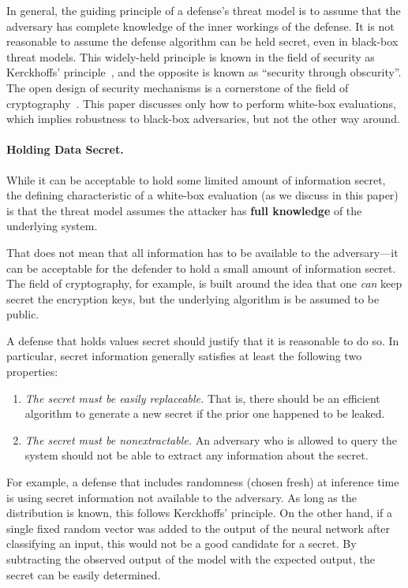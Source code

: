 \documentclass{article} %
\begin{document}
In general, the guiding principle of a defense's threat model
is to assume that the adversary has complete 
knowledge of the inner workings of the
defense.
%
It is not reasonable to assume the defense
algorithm can be held secret, even in black-box threat models.
%
This widely-held principle is known in the field of security as Kerckhoffs'
principle~\citep{kerckhoffs1883cryptographic}, and the opposite is known as
``security through obscurity''.
%
The open design of security mechanisms is
a cornerstone of the field of cryptography~\citep{saltzer1975protection}.
%
This paper discusses only how to perform white-box evaluations, which implies
robustness to black-box adversaries,
but not the other way around. 

\paragraph{Holding Data Secret.}
%
While it can be acceptable to hold some limited amount of information
secret, the defining characteristic of a white-box evaluation (as
we discuss in this paper) is that the threat model assumes
the attacker has \textbf{full knowledge} of the underlying system.

That does not mean that all information has to be available to the
adversary---it can be acceptable for the defender to hold a small
amount of information secret.
%
The field of cryptography, for example, is built around the idea that
one \emph{can} keep secret
the encryption keys, but the underlying algorithm is be assumed to be public.

A defense that holds values secret should justify that it is reasonable to do so.
%
In particular, secret information generally
satisfies at least the following two properties:
\begin{enumerate}
\item \emph{The secret must be easily replaceable.} 
  That is, there should be an efficient algorithm to generate a new secret
  if the prior one happened to be leaked.
\item \emph{The secret must be nonextractable.} An adversary who is
  allowed to query the system should not be able to extract any information
  about the secret.
\end{enumerate}

For example, a defense that includes randomness (chosen fresh) at inference
time is using secret information not available to the adversary.
%
As long as the distribution is known, this follows Kerckhoffs' principle.
%
On the other hand, if a single fixed random vector was added to the output
of the neural network after classifying an input, this would not be a good
candidate for a secret.
%
By subtracting the observed output of the model with
the expected output, the secret can be easily determined.
\end{document}
